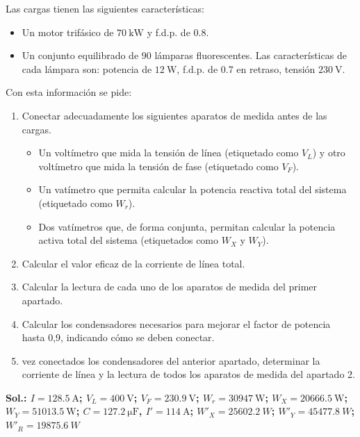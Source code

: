 \begin{enumerate}
  Las cargas tienen las siguientes características:

  \begin{itemize}
  \item Un motor trifásico de $\SI{70}{\kilo\watt}$ y f.d.p. de 0.8.
  \item Un conjunto equilibrado de 90 lámparas fluorescentes. Las
    características de cada lámpara son: potencia de $\SI{12}{\watt}$,
    f.d.p. de 0.7 en retraso, tensión $\SI{230}{\volt}$.
  \end{itemize}

  Con esta información se pide:

  \begin{enumerate}
  \item Conectar adecuadamente los siguientes aparatos de medida antes
    de las cargas.
    \begin{itemize}
    \item Un voltímetro que mida la tensión de línea (etiquetado como
      $V_L$) y otro voltímetro que mida la tensión de fase (etiquetado
      como $V_F$).
    \item Un vatímetro que permita calcular la potencia reactiva total
      del sistema (etiquetado como $W_r$).
    \item Dos vatímetros que, de forma conjunta, permitan calcular la
      potencia activa total del sistema (etiquetados como $W_X$ y
      $W_Y$).
    \end{itemize}
  \item Calcular el valor eficaz de la corriente de línea total.
  \item Calcular la lectura de cada uno de los aparatos de medida del
    primer apartado.
  \item Calcular los condensadores necesarios para mejorar el factor
    de potencia hasta 0,9, indicando cómo se deben conectar.
  \item vez conectados los condensadores del anterior apartado,
    determinar la corriente de línea y la lectura de todos los
    aparatos de medida del apartado 2.
  \end{enumerate}

  \textbf{Sol.: $I = \qty{128.5}{\ampere}$; $V_L = \qty{400}{\volt}$;
    $V_F = \qty{230.9}{\volt}$; $W_r = \qty{30947}{\watt}$;
    $W_X = \qty{20666.5}{\watt}$; $W_Y = \qty{51013.5}{\watt}$;
    $C=\SI{127.2}{\micro\farad}$, $I' = \qty{114}{\ampere}$;
    $W'_X = \SI{25602.2}{W}$; $W'_Y = \SI{45477.8}{W}$;
    $W'_R = \SI{19875.6}{W}$}


\end{enumerate}
